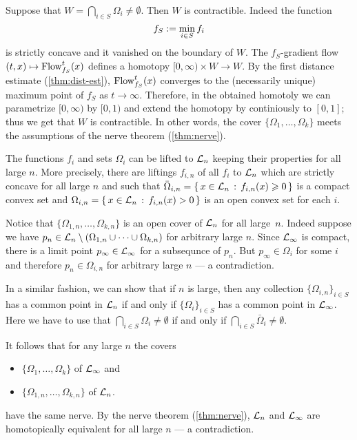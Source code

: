 Suppose that $W=\bigcap_{i\in S}\Omega_{i}\ne \emptyset$.
Then $W$ is contractible.
Indeed the function 
\[f_S\mathrel{:=}\min_{i\in S} f_i\]
is strictly concave and it vanished on the boundary of $W$.
The $f_S$-gradient flow $(t,x)\mapsto \mathop{\rm Flow}\nolimits_{f_S}^t(x)$ defines a homotopy
$[0,\infty)\times W\to W$.
By the first distance estimate (\ref{thm:dist-est}), $\mathop{\rm Flow}\nolimits_{f_S}^t(x)$ converges to the (necessarily unique) maximum point of $f_S$ as $t\to\infty$.
Therefore, in the obtained homotoly we can parametrize $[0,\infty)$ by $[0,1)$ and extend the homotopy by continiously to $[0,1]$;
thus we get that $W$ is contractible.
In other words, the cover $\{\Omega_1,\dots, \Omega_k\}$ meets the assumptions of the nerve theorem (\ref{thm:nerve}).

The functions $f_i$ and sets $\Omega_i$ can be lifted to $\mathcal{L}_n$ keeping their properties for all large $n$. 
More precisely, there are liftings $f_{i,n}$ of all $f_i$ to $\mathcal{L}_n$ which are strictly concave for all large $n$ and such that $\bar\Omega_{i,n}=\left\{\,{x\in \mathcal{L}_n}\,:\,{f_{i,n}(x)\geqslant 0}\,\right\}$ is a compact convex set and $\Omega_{i,n}\z=\set{x\in \spc{L}_n}{f_{i,n}(x)> 0}$ is an open convex set for each $i$.

Notice that $\{\Omega_{1,n},\dots,\Omega_{k,n}\}$ is an open cover of $\mathcal{L}_n$ for all large~$n$.
Indeed suppose we have $p_n\in \mathcal{L}_n\setminus(\Omega_{1,n}\cup\dots\cup\Omega_{k,n})$ for arbitrary large $n$.
Since $\mathcal{L}_\infty$ is compact, there is a limit point $p_\infty\in \mathcal{L}_\infty$ for a subsequnce of $p_n$.
But $p_\infty\in\Omega_i$ for some $i$ and therefore $p_n\in \Omega_{i,n}$ for arbitrary large $n$ --- a contradiction.

In a similar fashion, we can show that if $n$ is large, then any collection $\{\Omega_{i,n}\}_{i\in S}$ has a common point in $\mathcal{L}_n$ 
if and only if $\{\Omega_{i}\}_{i\in S}$ has a common point in $\mathcal{L}_\infty$.
Here we have to use that $\bigcap_{i\in S}\Omega_{i}\ne \emptyset$ if and only if $\bigcap_{i\in S}\bar\Omega_{i}\ne \emptyset$.

It follows that for any large $n$ the covers 
\begin{itemize}
\item $\{\Omega_{1},\dots,\Omega_{k}\}$ of $\mathcal{L}_\infty$ and 
\item $\{\Omega_{1,n},\dots,\Omega_{k,n}\}$ of $\mathcal{L}_n$.
\end{itemize}
have the same nerve.
By the nerve theorem (\ref{thm:nerve}), $\mathcal{L}_n$ and $\mathcal{L}_\infty$ are homotopically equivalent for all large $n$ --- a contradiction.
\qeds


